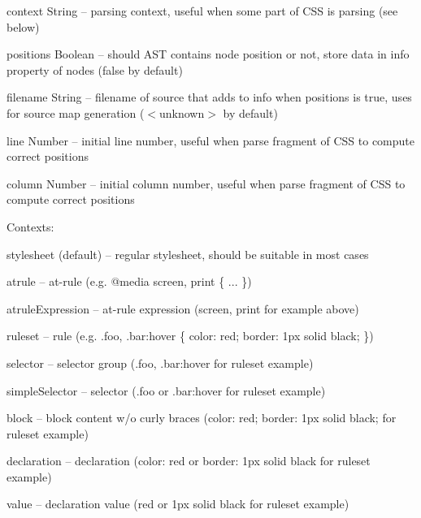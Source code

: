 \begin{DoxyItemize}
\item context {\ttfamily String} – parsing context, useful when some part of C\+SS is parsing (see below)
\item positions {\ttfamily Boolean} – should A\+ST contains node position or not, store data in {\ttfamily info} property of nodes ({\ttfamily false} by default)
\item filename {\ttfamily String} – filename of source that adds to info when {\ttfamily positions} is true, uses for source map generation ({\ttfamily $<$unknown$>$} by default)
\item line {\ttfamily Number} – initial line number, useful when parse fragment of C\+SS to compute correct positions
\item column {\ttfamily Number} – initial column number, useful when parse fragment of C\+SS to compute correct positions
\end{DoxyItemize}

Contexts\+:


\begin{DoxyItemize}
\item {\ttfamily stylesheet} (default) – regular stylesheet, should be suitable in most cases
\item {\ttfamily atrule} – at-\/rule (e.\+g. {\ttfamily @media screen, print \{ ... \}})
\item {\ttfamily atrule\+Expression} – at-\/rule expression ({\ttfamily screen, print} for example above)
\item {\ttfamily ruleset} – rule (e.\+g. {\ttfamily .foo, .bar\+:hover \{ color\+: red; border\+: 1px solid black; \}})
\item {\ttfamily selector} – selector group ({\ttfamily .foo, .bar\+:hover} for ruleset example)
\item {\ttfamily simple\+Selector} – selector ({\ttfamily .foo} or {\ttfamily .bar\+:hover} for ruleset example)
\item {\ttfamily block} – block content w/o curly braces ({\ttfamily color\+: red; border\+: 1px solid black;} for ruleset example)
\item {\ttfamily declaration} – declaration ({\ttfamily color\+: red} or {\ttfamily border\+: 1px solid black} for ruleset example)
\item {\ttfamily value} – declaration value ({\ttfamily red} or {\ttfamily 1px solid black} for ruleset example)
\end{DoxyItemize}


